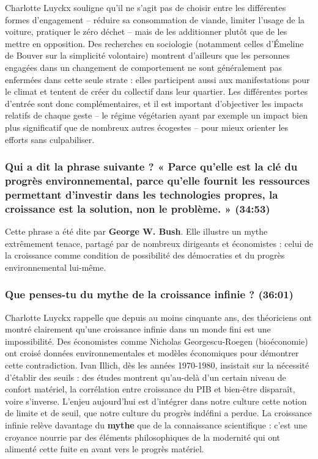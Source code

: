 Charlotte Luyckx souligne qu'il ne s'agit pas de choisir entre les différentes formes d'engagement -- réduire sa consommation de viande, limiter l'usage de la voiture, pratiquer le zéro déchet -- mais de les additionner plutôt que de les mettre en opposition. Des recherches en sociologie (notamment celles d'Émeline de Bouver sur la simplicité volontaire) montrent d'ailleurs que les personnes engagées dans un changement de comportement ne sont généralement pas enfermées dans cette seule strate : elles participent aussi aux manifestations pour le climat et tentent de créer du collectif dans leur quartier. Les différentes portes d'entrée sont donc complémentaires, et il est important d'objectiver les impacts relatifs de chaque geste -- le régime végétarien ayant par exemple un impact bien plus significatif que de nombreux autres écogestes -- pour mieux orienter les efforts sans culpabiliser.

\subsubsection{Qui a dit la phrase suivante ? « Parce qu'elle est la clé du progrès environnemental, parce qu'elle fournit les ressources permettant d'investir dans les technologies propres, la croissance est la solution, non le problème. » \textnormal{\small(34:53)}}

Cette phrase a été dite par \textbf{George W. Bush}. Elle illustre un mythe extrêmement tenace, partagé par de nombreux dirigeants et économistes : celui de la croissance comme condition de possibilité des démocraties et du progrès environnemental lui-même.

\subsubsection{Que penses-tu du mythe de la croissance infinie ? \textnormal{\small(36:01)}}

Charlotte Luyckx rappelle que depuis au moins cinquante ans, des théoriciens ont montré clairement qu'une croissance infinie dans un monde fini est une impossibilité. Des économistes comme Nicholas Georgescu-Roegen (bioéconomie) ont croisé données environnementales et modèles économiques pour démontrer cette contradiction. Ivan Illich, dès les années 1970-1980, insistait sur la nécessité d'établir des seuils : des études montrent qu'au-delà d'un certain niveau de confort matériel, la corrélation entre croissance du PIB et bien-être disparaît, voire s'inverse. L'enjeu aujourd'hui est d'intégrer dans notre culture cette notion de limite et de seuil, que notre culture du progrès indéfini a perdue. La croissance infinie relève davantage du \textbf{mythe} que de la connaissance scientifique : c'est une croyance nourrie par des éléments philosophiques de la modernité qui ont alimenté cette fuite en avant vers le progrès matériel.

